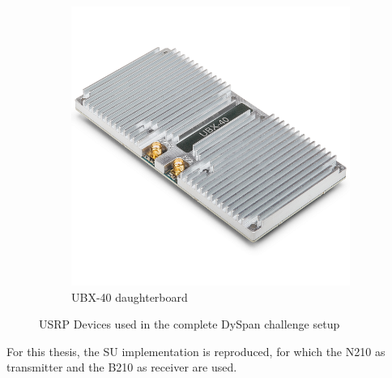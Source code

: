 \begin{figure}[htb]
\begin{subfigure}[htb]{0.5\textwidth}
        \label{fig:x300}
    \end{subfigure}
    \begin{subfigure}[htb]{0.4\textwidth}
        \centering
        \includegraphics[width=0.6\linewidth]{figures/UBX40}
        \caption{UBX-40 daughterboard}
        \label{fig:UBX}
    \end{subfigure}
    \caption{\ac{USRP} Devices used in the complete DySpan challenge setup}
    \label{fig:ettus}
\end{figure}

For this thesis, the \ac{SU} implementation is reproduced, for which the N210 as transmitter and the B210 as receiver are used.


